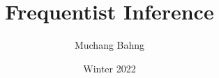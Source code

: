 \documentclass{article}
\begin{document}
\title{Frequentist Inference}
\author{Muchang Bahng}
\date{Winter 2022}

\maketitle
\tableofcontents
\pagebreak

 
% 
% 
% 
%  
%  
% 
% 
% 
\end{document}
